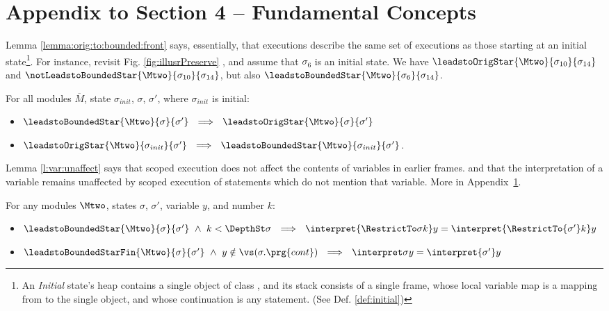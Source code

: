 \section{Appendix to Section 4 --  Fundamental Concepts }
\label{app:aux}

Lemma \ref{lemma:orig:to:bounded:front} says, essentially,  that \scoped executions describe the same set of executions as those  starting at an initial state\footnote{An \emph{Initial} state's heap contains a single object of class , and
its  stack   consists of a single frame, whose local variable map is a mapping from  to the single object, and whose continuation is  any statement.
(See Def. \ref{def:initial})}.   
For instance, revisit  Fig. \ref{fig:illusrPreserve} , and assume that $\sigma_6$ is an initial state.
We have  $\leadstoOrigStar {\Mtwo} {\sigma_{10}}  {\sigma_{14}}$ and $ \notLeadstoBoundedStar {\Mtwo}  {\sigma_{10}} {\sigma_{14}}$, but also 
 $\leadstoBoundedStar  {\Mtwo}  {\sigma_{6}}   {\sigma_{14}}$. %

 \begin{lemma}
\label{lemma:orig:to:bounded:front}
For all modules $\overline M$, state  $\sigma_{init}$,  $\sigma$, $\sigma'$, where
$\sigma_{init}$ is  initial:
\begin{itemize} %
\item 
\label{otbOne}
$\leadstoBoundedStar  {\Mtwo}  {\sigma} {\sigma'} \ \ \Longrightarrow \  \
\leadstoOrigStar {\Mtwo} {\sigma}  {\sigma'}$
\item 
\label{otbTwo}
$\leadstoOrigStar {\Mtwo} {\sigma_{init}}  {\sigma'}  \ \  \Longrightarrow\ \
\leadstoBoundedStar  {\Mtwo}  {\sigma_{init}} {\sigma'}$.
\end{itemize}
\end{lemma}

\vspace{.05cm}

{Lemma \ref{l:var:unaffect} says that scoped execution does not affect the contents of variables in earlier frames.}
and that 
the interpretation of a variable remains unaffected by
scoped execution of statements  which do not mention that variable. More  in Appendix~\ref{app:aux}.

\begin{lemma}
\label{l:var:unaffect}
For any modules $\Mtwo$, states $\sigma$, $\sigma'$,  variable $y$, and number $k$:
\begin{itemize}
\item
\label{carInFrame}
{$\leadstoBoundedStar {\Mtwo}  {\sigma}  {\sigma'}  \ \wedge \ k<\DepthSt \sigma  \ \ \Longrightarrow \ \  \interpret {\RestrictTo \sigma k} y =  \interpret {\RestrictTo {\sigma'} k} y$
}
\item
$\leadstoBoundedStarFin {\Mtwo}  {\sigma}  {\sigma'} \ \wedge \ y\notin \vs(\sigma.\prg{cont}) \ \ \Longrightarrow \ \  \interpret \sigma y =  \interpret {\sigma'} y$
\end{itemize}
\end{lemma}

